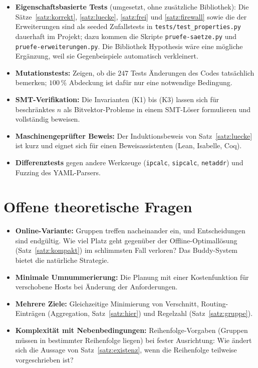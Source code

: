 \documentclass[a4paper,12pt, twoside]{report}
\theoremstyle{definition}
\begin{document}
\begin{itemize}
	\item \textbf{Eigenschaftsbasierte Tests} (umgesetzt, ohne zusätzliche Bibliothek): Die Sätze~\ref{satz:korrekt}, \ref{satz:luecke}, \ref{satz:frei} und \ref{satz:firewall} sowie die der Erweiterungen sind als seeded Zufallstests in \texttt{tests/test\_properties.py} dauerhaft im Projekt; dazu kommen die Skripte \texttt{pruefe-saetze.py} und \texttt{pruefe-erweiterungen.py}. Die Bibliothek Hypothesis wäre eine mögliche Ergänzung, weil sie Gegenbeispiele automatisch verkleinert.
	\item \textbf{Mutationstests:} Zeigen, ob die $247$ Tests Änderungen des Codes tatsächlich bemerken; $100\,\%$ Abdeckung ist dafür nur eine notwendige Bedingung.
	\item \textbf{SMT-Verifikation:} Die Invarianten (K1) bis (K3) lassen sich für beschränktes $n$ als Bitvektor-Probleme in einem SMT-Löser formulieren und vollständig beweisen.
	\item \textbf{Maschinengeprüfter Beweis:} Der Induktionsbeweis von Satz~\ref{satz:luecke} ist kurz und eignet sich für einen Beweisassistenten (Lean, Isabelle, Coq).
	\item \textbf{Differenztests} gegen andere Werkzeuge (\texttt{ipcalc}, \texttt{sipcalc}, \texttt{netaddr}) und Fuzzing des YAML-Parsers.
\end{itemize}

\section{Offene theoretische Fragen}

\begin{itemize}
	\item \textbf{Online-Variante:} Gruppen treffen nacheinander ein, und Entscheidungen sind endgültig. Wie viel Platz geht gegenüber der Offline-Optimallösung (Satz~\ref{satz:kompakt}) im schlimmsten Fall verloren? Das Buddy-System \cite{knuth} bietet die natürliche Strategie.
	\item \textbf{Minimale Umnummerierung:} Die Planung mit einer Kostenfunktion für verschobene Hosts bei Änderung der Anforderungen.
	\item \textbf{Mehrere Ziele:} Gleichzeitige Minimierung von Verschnitt, Routing-Einträgen (Aggregation, Satz~\ref{satz:hier}) und Regelzahl (Satz~\ref{satz:gruppe}).
	\item \textbf{Komplexität mit Nebenbedingungen:} Reihenfolge-Vorgaben (Gruppen müssen in bestimmter Reihenfolge liegen) bei fester Ausrichtung: Wie ändert sich die Aussage von Satz~\ref{satz:existenz}, wenn die Reihenfolge teilweise vorgeschrieben ist?
\end{itemize}
\end{document}

